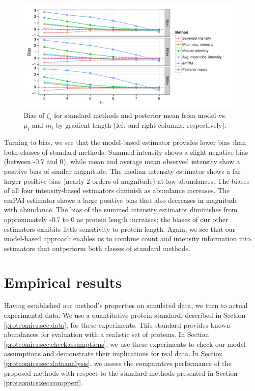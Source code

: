 \ifx\nofigures\undefined
\begin{figure}
\centering
\includegraphics[width=\textwidth, page=3]{figures/proteomics/figures_bias_sim}
\caption{Bias of $\hat{\zeta}_i$ for standard methods and posterior mean from model vs. $\mu_i$ and $m_i$ by gradient length (left and right columns, respectively).
\label{proteomics:fig:compare_bias}}
\end{figure}
\fi
%
Turning to bias, we see that the model-based estimator provides lower bias than both classes of standard methods.
Summed intensity shows a slight negative bias (between -0.7 and 0), while mean and average mean observed intensity show a positive bias of similar magnitude.
The median intensity estimator shows a far larger positive bias (nearly 2 orders of magnitude) at low abundances.
The biases of all four intensity-based estimators diminish as abundance increases.
The emPAI estimator shows a large positive bias that also decreases in magnitude with abundance.
The bias of the summed intensity estimator diminishes from approximately -0.7 to 0 as protein length increases; the biases of our other estimators exhibits little sensitivity to protein length.
Again, we see that our model-based approach enables us to combine count and intensity information into estimators that outperform both classes of standard methods.



\section{Empirical results}
\label{proteomics:sec:empirical}

Having established our method's properties on simulated data, we turn to actual experimental data.
We use a quantitative protein standard, described in Section \ref{proteomics:sec:data}, for these experiments.
This standard provides known abundances for evaluation with a realistic set of proteins.
In Section \ref{proteomics:sec:checkassumptions}, we use these experiments to check our model assumptions and demonstrate their implications for real data.
In Section \ref{proteomics:sec:dataanalysis}, we assess the comparative performance of the proposed methods with respect to the standard methods presented in Section \ref{proteomics:sec:compperf}.

